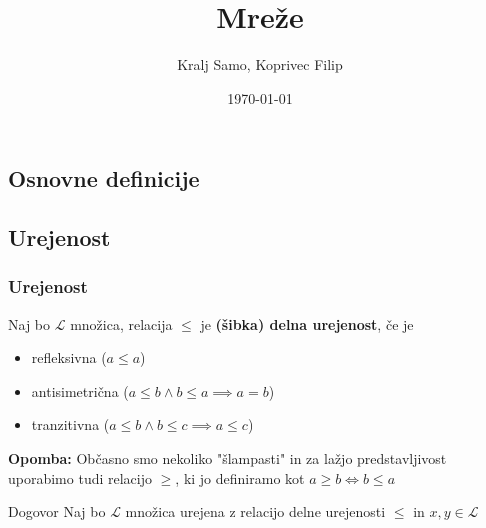 \documentclass[slovene]{beamer}
\author{Kralj Samo, Koprivec Filip}
\title{Mreže}
\institute{FMF}
\date{\today}
\newenvironment{remark}
{\textbf{Opomba:}}
{}
\begin{document}
\begin{frame}
	\titlepage
\end{frame}

\begin{frame}
	\tableofcontents
\end{frame}

\begin{frame}
\section{Osnovne definicije}
\subsection{Urejenost}
\frametitle{Urejenost}

\begin{definition}
Naj bo $\mathcal{L}$ množica, relacija $\leq$ je \textbf{(šibka) delna urejenost}, če je
\begin{itemize}
\item refleksivna ($a \leq a$)
\item antisimetrična ($a \leq b \land b \leq a \implies a = b$)
\item tranzitivna ($a \leq b \land b \leq c \implies a \leq c$)
\end{itemize}
\end{definition}

\begin{remark}
Občasno smo nekoliko "šlampasti" in za lažjo predstavljivost uporabimo tudi relacijo $\geq$, ki jo definiramo kot $a \geq b \iff b \leq a$
\end{remark}

\begin{block}{Dogovor}
Naj bo $\mathcal{L}$ množica urejena z relacijo delne urejenosti $\leq$ in $x,y \in \mathcal{L}$
\end{block}

\end{frame}
\end{document}

